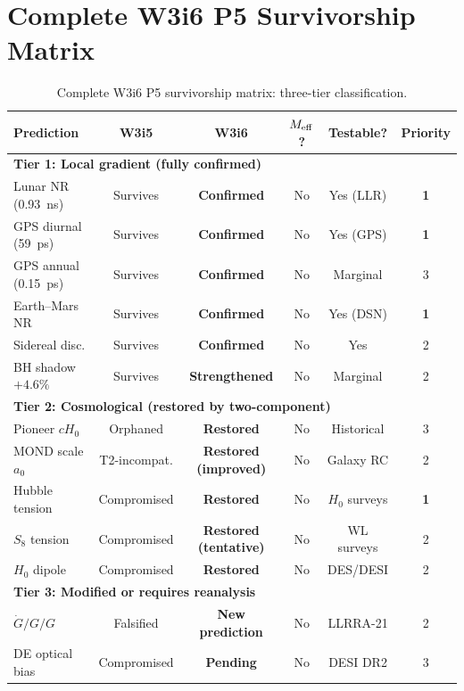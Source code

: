 \documentclass[11pt]{article}
\newcommand{\Meff}{M_{\rm eff}}
\newcommand{\Hzero}{H_0}
\newcommand{\aM}{a_0}
\newcommand{\Gdot}{\dot{G}/G}
\begin{document}
\section{Complete W3i6 P5 Survivorship Matrix}
\label{sec:P5-matrix}

\begin{table}[H]
\centering
\caption{Complete W3i6 P5 survivorship matrix: three-tier classification.}
\label{tab:P5-matrix}
\begin{tabular}{p{3cm}ccccc}
\toprule
\textbf{Prediction} & \textbf{W3i5} & \textbf{W3i6} &
  \textbf{$\Meff$?} & \textbf{Testable?} & \textbf{Priority} \\
\midrule
\multicolumn{6}{l}{\textbf{Tier 1: Local gradient (fully confirmed)}} \\
\midrule
Lunar NR (0.93~ns) & Survives & \textbf{Confirmed} & No & Yes (LLR) & \textbf{1} \\
GPS diurnal (59~ps) & Survives & \textbf{Confirmed} & No & Yes (GPS) & \textbf{1} \\
GPS annual (0.15~ps) & Survives & \textbf{Confirmed} & No & Marginal & 3 \\
Earth--Mars NR & Survives & \textbf{Confirmed} & No & Yes (DSN) & \textbf{1} \\
Sidereal disc. & Survives & \textbf{Confirmed} & No & Yes & 2 \\
BH shadow $+4.6\%$ & Survives & \textbf{Strengthened} & No & Marginal & 2 \\
\midrule
\multicolumn{6}{l}{\textbf{Tier 2: Cosmological (restored by two-component)}} \\
\midrule
Pioneer $c\Hzero$ & Orphaned & \textbf{Restored} & No & Historical & 3 \\
MOND scale $\aM$ & T2-incompat. & \textbf{Restored (improved)} & No & Galaxy RC & 2 \\
Hubble tension & Compromised & \textbf{Restored} & No & $\Hzero$ surveys & \textbf{1} \\
$S_8$ tension & Compromised & \textbf{Restored (tentative)} & No & WL surveys & 2 \\
$\Hzero$ dipole & Compromised & \textbf{Restored} & No & DES/DESI & 2 \\
\midrule
\multicolumn{6}{l}{\textbf{Tier 3: Modified or requires reanalysis}} \\
\midrule
$\Gdot/G$ & Falsified & \textbf{New prediction} & No & LLRRA-21 & 2 \\
DE optical bias & Compromised & \textbf{Pending} & No & DESI DR2 & 3 \\
\bottomrule
\end{tabular}
\end{table}
\end{document}
